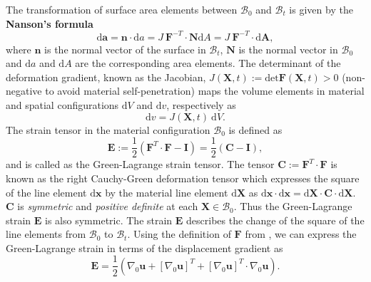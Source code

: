 The transformation of surface area elements between $\mathcal{B}_0$ and $\mathcal{B}_t$ is given by the \textbf{Nanson's formula}
\begin{equation}
\bm{\mathrm{d}}\mathbf{a} = \mathbf{n} \cdot \mathrm{d}a = J \ \mathbf{F}^{-T} \cdot \mathbf{N} \mathrm{d}A = J \ \mathbf{F}^{-T} \cdot \bm{\mathrm{d}}\mathbf{A},
\end{equation}
where $\mathbf{n}$ is the normal vector of the surface in $\mathcal{B}_t$, $\mathbf{N}$ is the normal vector in $\mathcal{B}_0$ and $\mathrm{d}a$ and $\mathrm{d}A$ are the corresponding area elements. The determinant of the deformation gradient, known as the Jacobian, $J(\mathbf{X}, t) := \text{det} \mathbf{F}(\mathbf{X}, t) > 0$ (non-negative to avoid material self-penetration) maps the volume elements in material and spatial configurations $\mathrm{d}V$ and $\mathrm{d}v$, respectively as 
\begin{equation}
\mathrm{d}v = J(\mathbf{X}, t) \ \mathrm{d}V.
\end{equation} 
The strain tensor in the material configuration $\mathcal{B}_0$ is defined as
\begin{equation}
\mathbf{E} := \frac{1}{2} (\mathbf{F}^T \cdot \mathbf{F} - \mathbf{I}) = \frac{1}{2} (\mathbf{C} - \mathbf{I}),
\end{equation}
and is called as the Green-Lagrange strain tensor. The tensor $\mathbf{C}:= \mathbf{F}^T \cdot \mathbf{F}$ is known as the right Cauchy-Green deformation tensor which expresses the square of the line element $\bm{\mathrm{d}}\mathbf{x}$ by the material line element $\bm{\mathrm{d}}\mathbf{X}$ as $\bm{\mathrm{d}}\mathbf{x} \cdot \bm{\mathrm{d}}\mathbf{x} = \bm{\mathrm{d}}\mathbf{X} \cdot \mathbf{C} \cdot \bm{\mathrm{d}}\mathbf{X}$. $\mathbf{C}$ is \textit{symmetric} and \textit{positive definite} at each $\mathbf{X} \in \mathcal{B}_0$. Thus the Green-Lagrange strain $\mathbf{E}$ is also symmetric. The strain $\mathbf{E}$ describes the change of the square of the line elements from $\mathcal{B}_0$ to $\mathcal{B}_t$. Using the definition of $\mathbf{F}$ from , we can express the Green-Lagrange strain in terms of the displacement gradient as 
\begin{equation}
\mathbf{E} = \frac{1}{2} ( \nabla_0 \mathbf{u} + [\nabla_0 \mathbf{u}]^T + [\nabla_0 \mathbf{u}]^T \cdot \nabla_0 \mathbf{u} ).
\end{equation}

